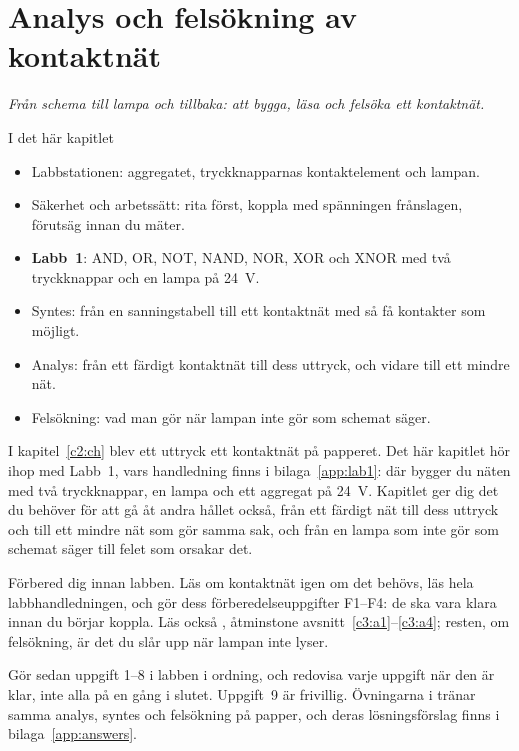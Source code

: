 
\chapter{Analys och felsökning av kontaktnät}
\label{c3:ch}

{\large\itshape Från schema till lampa och tillbaka: att bygga, läsa och felsöka ett
kontaktnät.\par}

\begin{chapterbox}{I det här kapitlet}
\begin{itemize}
  \item Labbstationen: aggregatet, tryckknapparnas kontaktelement och lampan.
  \item Säkerhet och arbetssätt: rita först, koppla med spänningen frånslagen, förutsäg innan du
    mäter.
  \item \textbf{Labb~1}: AND, OR, NOT, NAND, NOR, XOR och XNOR med två tryckknappar och en lampa på
    24~V.
  \item Syntes: från en sanningstabell till ett kontaktnät med så få kontakter som möjligt.
  \item Analys: från ett färdigt kontaktnät till dess uttryck, och vidare till ett mindre nät.
  \item Felsökning: vad man gör när lampan inte gör som schemat säger.
\end{itemize}
\end{chapterbox}

I kapitel~\ref{c2:ch} blev ett uttryck ett kontaktnät på papperet. Det här kapitlet hör ihop med
Labb~1, vars handledning finns i bilaga~\ref{app:lab1}: där bygger du näten med två tryckknappar,
en lampa och ett aggregat på 24~V. Kapitlet ger dig det du behöver för att gå åt andra hållet
också, från ett färdigt nät till dess uttryck och till ett mindre nät som gör samma sak, och från
en lampa som inte gör som schemat säger till felet som orsakar det.

Förbered dig innan labben. Läs  om kontaktnät igen om det behövs, läs hela
labbhandledningen, och gör dess förberedelseuppgifter F1--F4: de ska vara klara innan du börjar
koppla. Läs också , åtminstone avsnitt~\ref{c3:a1}--\ref{c3:a4}; resten, om
felsökning, är det du slår upp när lampan inte lyser.

Gör sedan uppgift 1--8 i labben i ordning, och redovisa varje uppgift när den är klar, inte alla på
en gång i slutet. Uppgift~9 är frivillig. Övningarna i  tränar samma
analys, syntes och felsökning på papper, och deras lösningsförslag finns i
bilaga~\ref{app:answers}.




